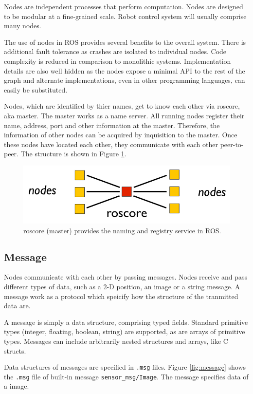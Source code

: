 \documentclass[a4paper, 10pt, conference]{ieeeconf}       %
\begin{document}
Nodes are independent processes that perform computation. Nodes are designed to be modular at a fine-grained scale. Robot control system will usually comprise many nodes.

The use of nodes in ROS provides several benefits to the overall system. There is additional fault tolerance as crashes are isolated to individual nodes. Code complexity is reduced in comparison to monolithic systems. Implementation details are also well hidden as the nodes expose a minimal API to the rest of the graph and alternate implementations, even in other programming languages, can easily be substituted. 

Nodes, which are identified by thier names, get to know each other via roscore, aka master. The master works as a name server. All running nodes register their name, address, port and other information at the master. Therefore, the information of other nodes can be acquired by inquisition to the master. Once these nodes have located each other, they communicate with each other peer-to-peer. The structure is shown in Figure \ref{fig:master}.

\begin{figure}[htpb]
  \centering
  \includegraphics[width=.4\textwidth]{nodes}
  \caption{roscore (master) provides the naming and registry service in ROS.}
  \label{fig:master}
\end{figure}

\subsection{Message}

Nodes communicate with each other by passing messages. Nodes receive and pass different types of data, such as a 2-D position, an image or a string message. A message work as a protocol which speicify how the structure of the tranmitted data are.

A message is simply a data structure, comprising typed fields. Standard primitive types (integer, floating, boolean, string) are supported, as are arrays of primitive types. Messages can include arbitrarily nested structures and arrays, like C structs.

Data structures of messages are specified in \texttt{.msg} files. Figure \ref{fig:message} shows the \texttt{.msg} file of built-in message \texttt{sensor\_msg/Image}. The message specifies data of a image.
\end{document}
